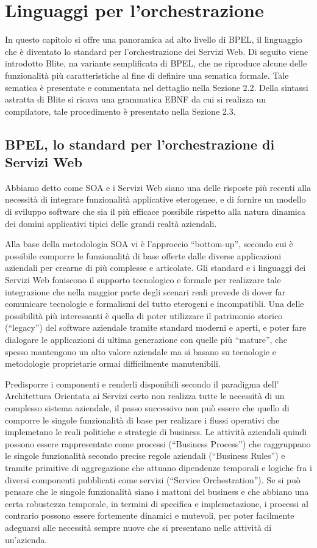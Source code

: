 \chapter{Linguaggi per l'orchestrazione}

In questo capitolo si offre una panoramica ad alto livello di BPEL, il
linguaggio che è diventato lo standard per l'orchestrazione dei Servizi Web.
Di seguito viene introdotto Blite, na variante semplificata di
BPEL, che ne riproduce alcune delle funzionalità più caratteristiche al fine
di definire una sematica formale. Tale sematica è presentate e commentata nel
dettaglio nella Sezione 2.2. Della sintassi astratta di Blite si ricava una
grammatica EBNF da cui si realizza un compilatore, tale procedimento è
presentato nella Sezione 2.3.

\section{BPEL, lo standard per l'orchestrazione di Servizi Web}
Abbiamo detto come SOA e i Servizi Web siano una delle risposte più recenti
alla necessità di integrare funzionalità applicative eterogenee, e di fornire
un modello di sviluppo software che sia il pi\`u efficace possibile rispetto
alla natura dinamica dei domini applicativi tipici delle grandi realtà
aziendali.

Alla base della metodologia SOA vi è l'approccio ``bottom-up'', secondo cui è
possibile comporre le funzionalità di base offerte dalle diverse applicazioni
aziendali per crearne di più complesse e articolate. Gli standard e i linguaggi
dei Servizi Web foniscono il supporto tecnologico e formale per realizzare tale
integrazione che nella maggior parte degli scenari reali prevede di dover far
comunicare tecnologie e formalismi del tutto eterogeni e incompatibli. Una delle
possibilità più interessanti è quella di poter utilizzare il patrimonio storico
(``legacy'') del software aziendale tramite standard moderni e aperti, e poter
fare dialogare le applicazioni di ultima generazione con quelle più ``mature'',
che spesso mantengono un alto valore aziendale ma si basano su tecnologie e
metodologie proprietarie ormai difficilmente manutenibili.

Predisporre i componenti e renderli disponibili secondo il paradigma dell'
Architettura Orientata ai Servizi certo non realizza tutte le necessità di un
complesso sistema aziendale, il passo successivo non può essere che quello di
comporre le singole funzionalità di base per realizare i flussi operativi che
implemetano le reali politiche e strategie di business. Le attività aziendali
quindi possono essere rappresentate come processi (``Business Process'') che
raggruppano le singole funzionalità secondo precise regole aziendali (``Business
Rules'') e tramite primitive di aggregazione che attuano dipendenze temporali e
logiche fra i diversi componenti pubblicati come servizi (``Service
Orchestration''). Se si può pensare che le singole funzionalità siano i mattoni
del business e che abbiano una certa robustezza temporale, in termini di
specifica e implemetazione, i processi al contrario possono essere fortemente
dinamici e mutevoli, per poter facilmente adeguarsi alle necessità sempre nuove
che si presentano nelle attività di un'azienda.

